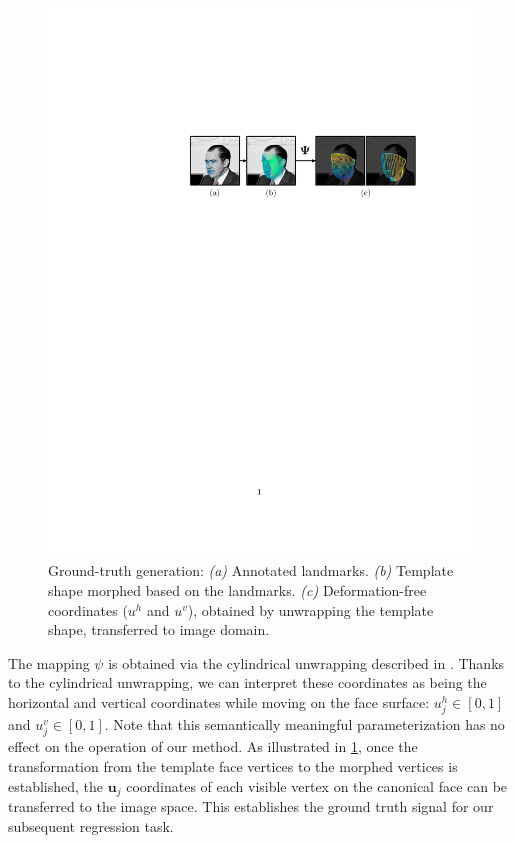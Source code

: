 %
\begin{figure}
\centering
\includegraphics[trim={7.2cm 18.3cm 2.7cm 6.5cm}, clip, width=\linewidth]{resources/Human_Poses/Obtaining_GT}
\caption{Ground-truth generation: \emph{(a)} Annotated landmarks. \emph{(b)} Template shape morphed based on the landmarks. \emph{(c)} Deformation-free coordinates (${u^h}$ and ${u^v}$), obtained by unwrapping the template shape, transferred to image domain. }

\label{fig:GT}
\end{figure}

The mapping $\psi$ is obtained via the cylindrical unwrapping described in \cite{booth2014optimal}. Thanks to the cylindrical unwrapping, we can interpret these coordinates as being the horizontal and vertical coordinates while moving on the face surface: ${u}_j^h \in [0,1]$ and ${u}_j^v \in [0,1]$. Note that this semantically meaningful parameterization has no effect on the operation of our method.
As  illustrated in \ref{fig:GT}, once the transformation from the template face vertices to the morphed vertices is established, the  $\bm{u}_j$ coordinates of each visible vertex on the canonical face can be transferred to the image space. This establishes the ground truth signal for our subsequent regression task.

